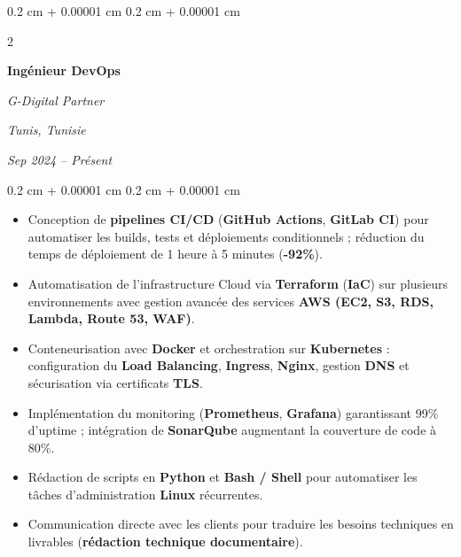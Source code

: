 \documentclass[9pt, letterpaper]{article}
\newenvironment{highlights}{
    \begin{itemize}[
        topsep=0.03 cm,
        parsep=0.03 cm,
        partopsep=0pt,
        itemsep=0pt,
        leftmargin=0.4 cm + 10pt
    ]
}{
    \end{itemize}
}
\newenvironment{onecolentry}{
    \begin{adjustwidth}{
        0.2 cm + 0.00001 cm
    }{
        0.2 cm + 0.00001 cm
    }
}{
    \end{adjustwidth}
}
\newenvironment{twocolentry}[2][]{
    \onecolentry
    \def\secondColumn{#2}
    \setcolumnwidth{\fill, 4.5 cm}
    \begin{paracol}{2}
}{
    \switchcolumn \raggedleft \secondColumn
    \end{paracol}
    \endonecolentry
}
\begin{document}
    \begin{twocolentry}{
        \textit{Tunis, Tunisie}

        \textit{Sep 2024 -- Présent}}
        \textbf{Ingénieur DevOps}

        \textit{G-Digital Partner}
    \end{twocolentry}
\begin{onecolentry}
    \begin{highlights}
        \item Conception de \textbf{pipelines CI/CD} (\textbf{GitHub Actions}, \textbf{GitLab CI}) pour automatiser les builds, tests et déploiements conditionnels ; réduction du temps de déploiement de 1 heure à 5 minutes (\textbf{-92\%}).
        \item Automatisation de l'infrastructure Cloud via \textbf{Terraform} (\textbf{IaC}) sur plusieurs environnements avec gestion avancée des services \textbf{AWS (EC2, S3, RDS, Lambda, Route 53, WAF)}.
        \item Conteneurisation avec \textbf{Docker} et orchestration sur \textbf{Kubernetes} : configuration du \textbf{Load Balancing}, \textbf{Ingress}, \textbf{Nginx}, gestion \textbf{DNS} et sécurisation via certificats \textbf{TLS}.
        \item Implémentation du monitoring (\textbf{Prometheus}, \textbf{Grafana}) garantissant 99\% d'uptime ; intégration de \textbf{SonarQube} augmentant la couverture de code à 80\%.
        \item Rédaction de scripts en \textbf{Python} et \textbf{Bash / Shell} pour automatiser les tâches d'administration \textbf{Linux} récurrentes.
        \item Communication directe avec les clients pour traduire les besoins techniques en livrables (\textbf{rédaction technique documentaire}).
    \end{highlights}
\end{onecolentry}
\end{document}
